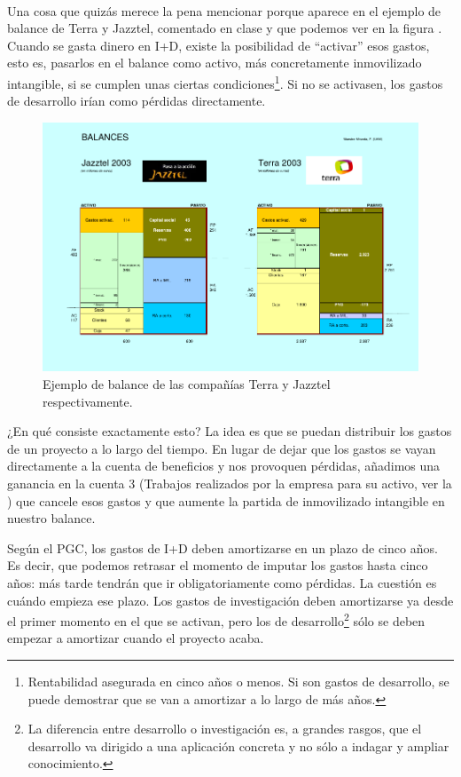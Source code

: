\documentclass[nochap,palatino,shortheader]{apuntes}
\begin{document}
\paragraph{} Una cosa que quizás merece la pena mencionar porque aparece en el ejemplo de balance de Terra y Jazztel, comentado en clase y que podemos ver en la figura . Cuando se gasta dinero en I+D, existe la posibilidad de ``activar'' esos gastos, esto es, pasarlos en el balance como activo, más concretamente inmovilizado intangible, si se cumplen unas ciertas condiciones\footnote{Rentabilidad asegurada en cinco años o menos. Si son gastos de desarrollo, se puede demostrar que se van a amortizar a lo largo de más años.}. Si no se activasen, los gastos de desarrollo irían como pérdidas directamente.

\begin{figure}[hbtp]
\centering
\includegraphics[width=\textwidth]{img/TerraJazztel.png}
\caption{Ejemplo de balance de las compañías Terra y Jazztel respectivamente.}
\label{fig:TerraJazztel}
\end{figure}

¿En qué consiste exactamente esto? La idea es que se puedan distribuir los gastos de un proyecto a lo largo del tiempo. En lugar de dejar que los gastos se vayan directamente a la cuenta de beneficios y nos provoquen pérdidas, añadimos una ganancia en la cuenta 3 (Trabajos realizados por la empresa para su activo, ver la ) que cancele esos gastos y que aumente la partida de inmovilizado intangible en nuestro balance.

Según el PGC, los gastos de I+D deben amortizarse en un plazo de cinco años. Es decir, que podemos retrasar el momento de imputar los gastos hasta cinco años: más tarde tendrán que ir obligatoriamente como pérdidas. La cuestión es cuándo empieza ese plazo. Los gastos de investigación deben amortizarse ya desde el primer momento en el que se activan, pero los de desarrollo\footnote{La diferencia entre desarrollo o investigación es, a grandes rasgos, que el desarrollo va dirigido a una aplicación concreta y no sólo a indagar y ampliar conocimiento.} sólo se deben empezar a amortizar cuando el proyecto acaba.
\end{document}
